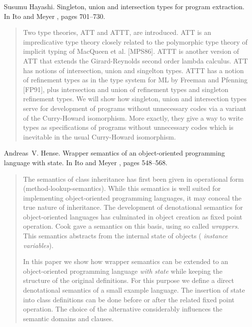 \begin{thebibliography}{10}
Susumu Hayashi.
\newblock Singleton, union and intersection types for program extraction.
\newblock In Ito and Meyer \cite{TACS91}, pages 701--730.
\begin{quotation}
Two type theories, ATT and ATTT, are introduced. ATT is an impredicative type
  theory closely related to the polymorphic type theory of implicit typing of
  MacQueen et al. [MPS86]. ATTT is another version of ATT that extends the
  Girard-Reynolds second order lambda calculus. ATT has notions of
  intersection, union and singelton types. ATTT has a notion of refinement
  types as in the type system for ML by Freeman and Pfenning [FP91], plus
  intersection and union of refinement types and singleton refinement types. We
  will show how singleton, union and intersection types serve for development
  of programs without unnecessary codes via a variant of the Curry-Howard
  isomorphism. More exactly, they give a way to write types as specifications
  of programs without unnecessary codes which is inevitable in the usual
  Curry-Howard isomorphism.
\end{quotation}

Andreas~V. Hense.
\newblock Wrapper semantics of an object-oriented programming language with
  state.
\newblock In Ito and Meyer \cite{TACS91}, pages 548--568.
\begin{quotation}
The semantics of class inheritance has first been given in operational form
  (method-lookup-semantics). While this semantics is well suited for
  implementing object-oriented programming languages, it may conceal the true
  nature of inheritance. The development of denotational semantics for
  object-oriented languages has culminated in object creation as fixed point
  operation. Cook gave a semantics on this basis, using so called {\em
  wrappers}. This semantics abstracts from the internal state of objects ({\em
  instance variables\/}). \par In this paper we show how wrapper semantics can
  be extended to an object-oriented programming language {\em with state\/}
  while keeping the structure of the original definitions. For this purpose we
  define a direct denotational semantics of a small example language. The
  insertion of state into class definitions can be done before or after the
  related fixed point operation. The choice of the alternative considerably
  influences the semantic domains and clauses.
\end{quotation}


\end{thebibliography}
